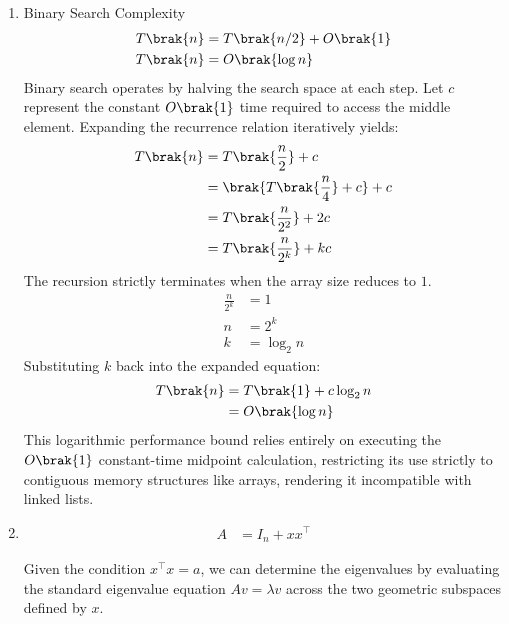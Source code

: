 \begin{enumerate}[label=\thesubsection.\arabic*, ref=\thesubsection.\theenumi]
	\item Binary Search Complexity
	\begin{align}
		T\brak{n} &= T\brak{n/2} + O\brak{1} \label{eq:DA2025-binary_recurrence}
		\\
		T\brak{n} &= O\brak{\log n} \label{eq:DA2025-binary_search}
	\end{align}
	\solution
	Binary search operates by halving the search space at each step. Let $c$ represent the constant $O\brak{1}$ time required to access the middle element. Expanding the recurrence relation iteratively yields:
	\begin{align}
		T\brak{n} &= T\brak{\frac{n}{2}} + c
		\\
		&= \brak{T\brak{\frac{n}{4}} + c} + c
		\\
		&= T\brak{\frac{n}{2^2}} + 2c
		\\
		&= T\brak{\frac{n}{2^k}} + kc
	\end{align}
	The recursion strictly terminates when the array size reduces to $1$. 
	\begin{align}
		\frac{n}{2^k} &= 1
		\\
		n &= 2^k
		\\
		k &= \log_2 n
	\end{align}
	Substituting $k$ back into the expanded equation:
	\begin{align}
		T\brak{n} &= T\brak{1} + c \log_2 n
		\\
		&= O\brak{\log n}
	\end{align}
	This logarithmic performance bound relies entirely on executing the $O\brak{1}$ constant-time midpoint calculation, restricting its use strictly to contiguous memory structures like arrays, rendering it incompatible with linked lists.
	\item 
	\begin{align}
		A &= I_n + x x^\top \label{eq:DA2025-rank1_update}
	\end{align}
	
	Given the condition $x^\top x = a$, we can determine the eigenvalues by evaluating the standard eigenvalue equation $A v = \lambda v$ across the two geometric subspaces defined by $x$.
	

\end{enumerate}
